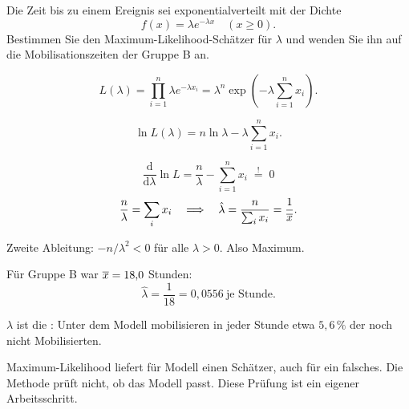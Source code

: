 \begin{aufgabe}
Die Zeit bis zu einem Ereignis sei exponentialverteilt mit der Dichte
\[ f(x) = \lambda e^{-\lambda x} \quad (x \ge 0) . \]
Bestimmen Sie den Maximum-Likelihood-Schätzer für $\lambda$ und wenden Sie ihn auf die Mobilisationszeiten der Gruppe B an.

\loesung
{}
\[ L(\lambda) = \prod_{i=1}^n \lambda e^{-\lambda x_i} = \lambda^n \exp\!\left(-\lambda\sum_{i=1}^n x_i\right) . \]

\[ \ln L(\lambda) = n\ln\lambda - \lambda\sum_{i=1}^n x_i . \]

\[ \frac{\mathrm{d}}{\mathrm{d}\lambda}\ln L = \frac{n}{\lambda} - \sum_{i=1}^n x_i \;\stackrel{!}{=}\; 0 \]
\[ \frac{n}{\lambda} = \sum_i x_i \quad\Longrightarrow\quad \hat\lambda = \frac{n}{\sum_i x_i} = \frac{1}{\overline{x}} . \]

Zweite Ableitung: $-n/\lambda^2 < 0$ für alle $\lambda > 0$. Also Maximum. \checkmark

Für Gruppe B war $\overline{x} = 18{,}0$ Stunden:
\[ \hat\lambda = \frac{1}{18} = 0{,}0556 \ \text{je Stunde} . \]

$\lambda$ ist die : Unter dem Modell mobilisieren in jeder Stunde etwa $5{,}6\,\%$ der noch nicht Mobilisierten.

\begin{center}
\begin{minipage}{0.86\textwidth}
\end{minipage}
\end{center}

Maximum-Likelihood liefert für  Modell einen Schätzer, auch für ein falsches. Die Methode prüft nicht, ob das Modell passt. Diese Prüfung ist ein eigener Arbeitsschritt.
\end{aufgabe}

